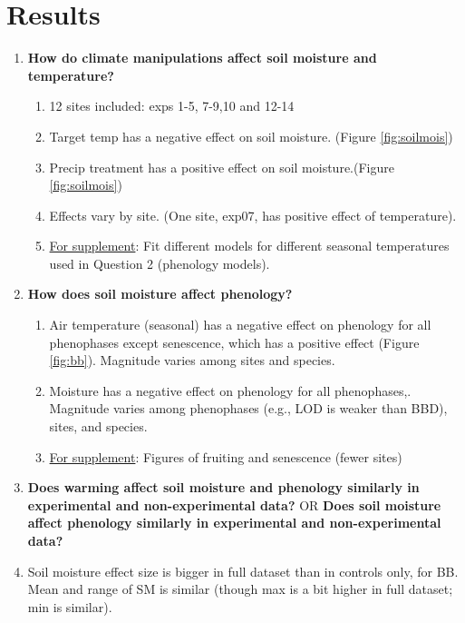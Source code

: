 \documentclass{article}
\begin{document}
\section* {Results}
\begin{singlespace}

\begin{enumerate}
\item {\textbf{How do climate manipulations affect soil moisture and temperature?}}
\begin{enumerate}
\item{12 sites included: exps 1-5, 7-9,10 and 12-14}
\item{Target temp has a negative effect on soil moisture. (Figure \ref {fig:soilmois})}
\item{Precip treatment has a positive effect on soil moisture.(Figure \ref {fig:soilmois})}
\item{Effects vary by site. (One site, exp07, has positive effect of temperature).}
\item \underline{For supplement}: Fit different models for different seasonal temperatures used in Question 2 (phenology models).
\end{enumerate}

\item{\textbf{How does soil moisture affect phenology?
}}
\begin{enumerate}
\item Air temperature (seasonal) has a negative effect on phenology for all phenophases except senescence, which has a positive effect (Figure \ref{fig:bb}). Magnitude varies among sites and species. 
\item Moisture has a negative effect on phenology for all phenophases,. Magnitude varies among phenophases (e.g., LOD is weaker than BBD), sites, and species.
\item \underline{For supplement}: Figures of fruiting and senescence (fewer sites)
\end{enumerate}
\item {\textbf{Does warming affect soil moisture and phenology similarly in experimental and non-experimental data?}} OR {\textbf{Does soil moisture affect phenology similarly in experimental and non-experimental data?}}

\item {Soil moisture effect size is bigger in full dataset than in controls only, for BB.} Mean and range of SM is similar (though max is a bit higher in full dataset; min is similar).

\end{enumerate}
\end{singlespace}
\end{document}
